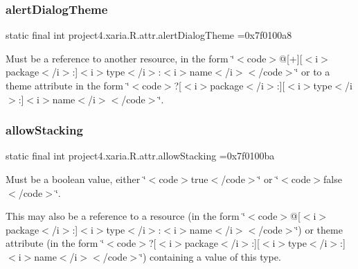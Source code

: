 \subsubsection{\texorpdfstring{alert\+Dialog\+Theme}{alertDialogTheme}}
{\footnotesize\ttfamily static final int project4.\+xaria.\+R.\+attr.\+alert\+Dialog\+Theme =0x7f0100a8\hspace{0.3cm}{\ttfamily [static]}}

Must be a reference to another resource, in the form \char`\"{}$<$code$>$@\mbox{[}+\mbox{]}\mbox{[}$<$i$>$package$<$/i$>$\+:\mbox{]}$<$i$>$type$<$/i$>$\+:$<$i$>$name$<$/i$>$$<$/code$>$\char`\"{} or to a theme attribute in the form \char`\"{}$<$code$>$?\mbox{[}$<$i$>$package$<$/i$>$\+:\mbox{]}\mbox{[}$<$i$>$type$<$/i$>$\+:\mbox{]}$<$i$>$name$<$/i$>$$<$/code$>$\char`\"{}. \mbox{\label{classproject4_1_1xaria_1_1R_1_1attr_ab8dd03d6eb82f4fadf1004ce71f1ce3a}} 
\subsubsection{\texorpdfstring{allow\+Stacking}{allowStacking}}
{\footnotesize\ttfamily static final int project4.\+xaria.\+R.\+attr.\+allow\+Stacking =0x7f0100ba\hspace{0.3cm}{\ttfamily [static]}}

Must be a boolean value, either \char`\"{}$<$code$>$true$<$/code$>$\char`\"{} or \char`\"{}$<$code$>$false$<$/code$>$\char`\"{}. 

This may also be a reference to a resource (in the form \char`\"{}$<$code$>$@\mbox{[}$<$i$>$package$<$/i$>$\+:\mbox{]}$<$i$>$type$<$/i$>$\+:$<$i$>$name$<$/i$>$$<$/code$>$\char`\"{}) or theme attribute (in the form \char`\"{}$<$code$>$?\mbox{[}$<$i$>$package$<$/i$>$\+:\mbox{]}\mbox{[}$<$i$>$type$<$/i$>$\+:\mbox{]}$<$i$>$name$<$/i$>$$<$/code$>$\char`\"{}) containing a value of this type. \mbox{\label{classproject4_1_1xaria_1_1R_1_1attr_a78f35c1e88a4c101ec8ba404897db388}} 
